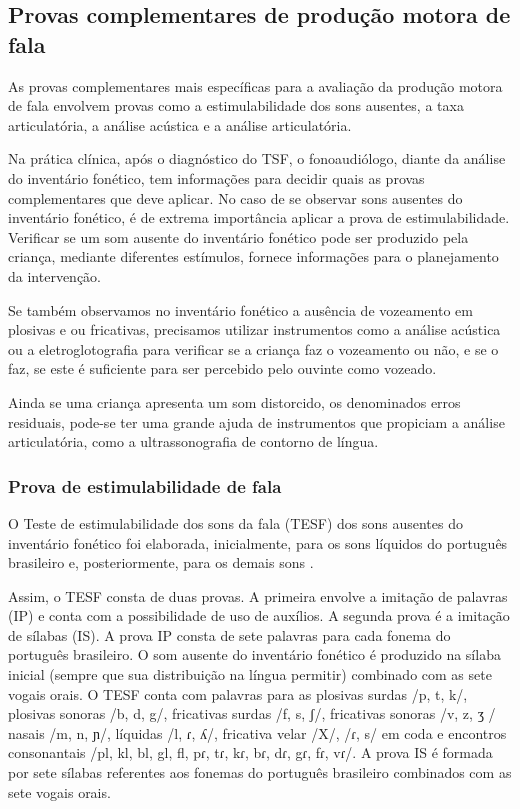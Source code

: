 \documentclass[output=paper,colorlinks,citecolor=brown,booklanguage=portuguese]{langscibook}
\begin{document}
\subsection{Provas complementares de produção motora de fala}
As provas complementares mais específicas para a avaliação da produção motora de fala envolvem provas como a estimulabilidade dos sons ausentes, a taxa articulatória, a análise acústica e a análise articulatória.

Na prática clínica, após o diagnóstico do TSF, o fonoaudiólogo, diante da análise do inventário fonético, tem informações para decidir quais as provas complementares que deve aplicar. No caso de se observar sons ausentes do inventário fonético, é de extrema importância aplicar a prova de estimulabilidade. Verificar se um som ausente do inventário fonético pode ser produzido pela criança, mediante diferentes estímulos, fornece informações para o planejamento da intervenção.

Se também observamos no inventário fonético a ausência de vozeamento em plosivas e ou fricativas, precisamos utilizar instrumentos como a análise acústica ou a eletroglotografia para verificar se a criança faz o vozeamento ou não, e se o faz, se este é suficiente para ser percebido pelo ouvinte como vozeado.

Ainda se uma criança apresenta um som distorcido, os denominados erros residuais, pode-se ter uma grande ajuda de instrumentos que propiciam a análise articulatória, como a ultrassonografia de contorno de língua.

\subsubsection{Prova de estimulabilidade de fala}

O Teste de estimulabilidade dos sons da fala (TESF) \citep{Castro2022} dos sons ausentes do inventário fonético foi elaborada, inicialmente, para os sons líquidos do português brasileiro \citep{Castro2009} e, posteriormente, para os demais sons \citep{Castro2012}.

Assim, o TESF consta de duas provas. A primeira envolve a imitação de palavras (IP) e conta com a possibilidade de uso de auxílios. A segunda prova é a imitação de sílabas (IS). A prova IP consta de sete palavras para cada fonema do português brasileiro. O som ausente do inventário fonético é produzido na sílaba inicial (sempre que sua distribuição na língua permitir) combinado com as sete vogais orais.  O TESF conta com palavras para as plosivas surdas /p, t, k/, plosivas sonoras /b, d, g/, fricativas surdas /f, s, ʃ/, fricativas sonoras /v, z, ʒ / nasais /m, n, ɲ/, líquidas /l, ɾ, ʎ/, fricativa velar /X/, /ɾ, s/ em coda e encontros consonantais /pl, kl, bl, gl, fl, pɾ, tɾ, kɾ, bɾ, dɾ, gɾ, fɾ, vɾ/. A prova IS é formada por sete sílabas referentes aos fonemas do português brasileiro combinados com as sete vogais orais. 
\end{document}
